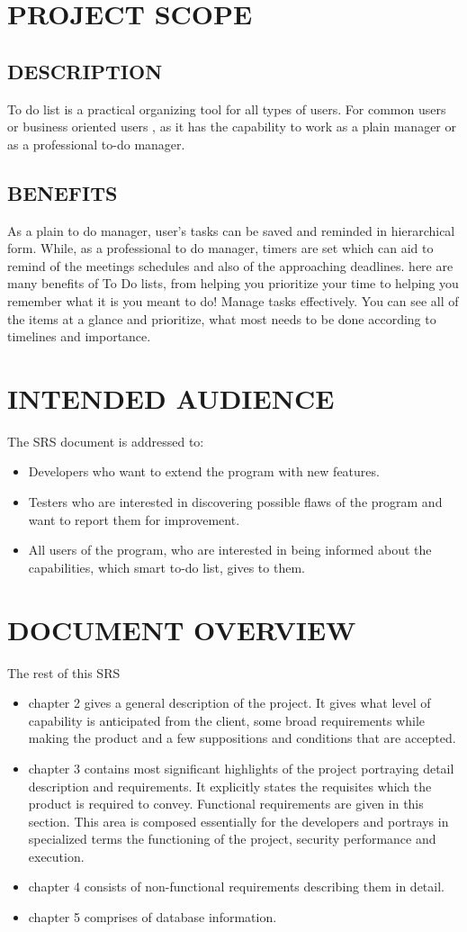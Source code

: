 \documentclass[12pt, a4paper]{report}
\begin{document}
\section{PROJECT SCOPE }
\subsection{DESCRIPTION}
To do list is a practical organizing tool for all types of users. For common users or business oriented users , as it has the capability to work as a plain manager or as a professional to-do manager.
\subsection{BENEFITS}
As a plain to do manager,  user’s tasks can be saved and reminded in hierarchical form. While, as a professional to do manager, timers are set which can aid to remind of the meetings schedules and also of the approaching deadlines.
here are many benefits of To Do lists, from helping you prioritize your time to helping you remember what it is you meant to do! Manage tasks effectively. You can see all of the items at a glance and prioritize, what most needs to be done according to timelines and importance.
\section{INTENDED AUDIENCE } 
The SRS document is addressed to:  
\begin{itemize}
	\item Developers  who want to extend the program with new features. 
	\item Testers  who are interested in discovering possible flaws of the program and want to report them for improvement. 
	\item All users of the program, who are interested in being informed about the capabilities, which smart to-do list, gives to them.  
\end{itemize}
\section{DOCUMENT OVERVIEW }
The rest of this SRS 
\begin{itemize}
	\item chapter 2 gives a general description of the project. It gives what level of capability is anticipated from the client, some broad requirements while making the product and a few suppositions and conditions that are accepted. 
	\item chapter 3 contains most significant highlights of the project portraying detail description and requirements. It explicitly states the requisites which the product is required to convey.  Functional requirements are given in this section. This area is composed essentially for the developers and portrays in specialized terms the functioning of the project, security performance and execution.
	\item chapter 4 consists of non-functional requirements describing them in detail.
	\item chapter 5 comprises of database information.
\end{itemize}
\end{document}
